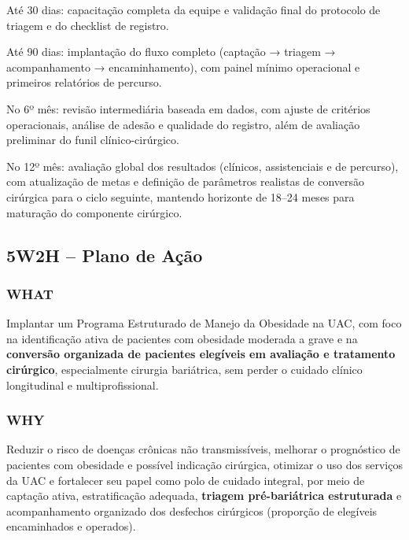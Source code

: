 \documentclass[12pt]{article}
\begin{document}
\begin{hlevelthree}
\item Até 30 dias: capacitação completa da equipe e validação final do protocolo de triagem e do checklist de registro.
\item Até 90 dias: implantação do fluxo completo (captação → triagem → acompanhamento → encaminhamento), com painel mínimo operacional e primeiros relatórios de percurso.
\item No 6º mês: revisão intermediária baseada em dados, com ajuste de critérios operacionais, análise de adesão e qualidade do registro, além de avaliação preliminar do funil clínico-cirúrgico.
\item No 12º mês: avaliação global dos resultados (clínicos, assistenciais e de percurso), com atualização de metas e definição de parâmetros realistas de conversão cirúrgica para o ciclo seguinte, mantendo horizonte de 18–24 meses para maturação do componente cirúrgico.
\end{hlevelthree}

\begin{center}

\label{org0674112}
\end{center}

\subsection{5W2H – Plano de Ação}
\label{sec:orgad0f256}
\subsubsection{WHAT}
\label{sec:orgb72efea}
Implantar um Programa Estruturado de Manejo da Obesidade na UAC, com foco na identificação ativa de pacientes com obesidade moderada a grave e na \textbf{\textbf{conversão organizada de pacientes elegíveis em avaliação e tratamento cirúrgico}}, especialmente cirurgia bariátrica, sem perder o cuidado clínico longitudinal e multiprofissional.

\subsubsection{WHY}
\label{sec:org0c8cc68}
Reduzir o risco de doenças crônicas não transmissíveis, melhorar o prognóstico de pacientes com obesidade e possível indicação cirúrgica, otimizar o uso dos serviços da UAC e fortalecer seu papel como polo de cuidado integral, por meio de captação ativa, estratificação adequada, \textbf{triagem pré-bariátrica estruturada} e acompanhamento organizado dos desfechos cirúrgicos (proporção de elegíveis encaminhados e operados).
\end{document}
